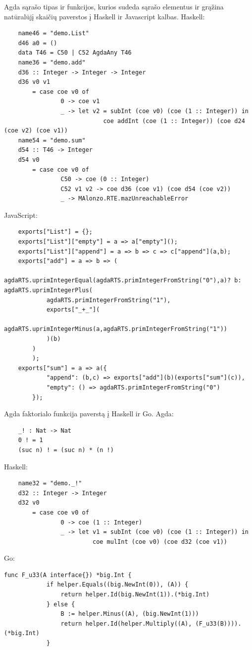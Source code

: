 \documentclass{VUMIFPSkursinis}
\begin{document}
\printbibliography[heading=bibintoc] 

	\label{sec:priedas1}
	Agda sąrašo tipas ir funkcijos, kurios sudeda sąrašo elementus ir grąžina natūralūjį skaičių paverstos į Haskell ir Javascript kalbas. \newline
	Haskell:
	\begin{lstlisting}
	name46 = "demo.List"
	d46 a0 = ()
	data T46 = C50 | C52 AgdaAny T46	
	name36 = "demo.add"
	d36 :: Integer -> Integer -> Integer
	d36 v0 v1
		= case coe v0 of
				0 -> coe v1
				_ -> let v2 = subInt (coe v0) (coe (1 :: Integer)) in
							coe addInt (coe (1 :: Integer)) (coe d24 (coe v2) (coe v1))
	name54 = "demo.sum"
	d54 :: T46 -> Integer
	d54 v0
		= case coe v0 of
				C50 -> coe (0 :: Integer)
				C52 v1 v2 -> coe d36 (coe v1) (coe d54 (coe v2))
				_ -> MAlonzo.RTE.mazUnreachableError
		\end{lstlisting}
	JavaScript:
	\begin{lstlisting}
	exports["List"] = {};
	exports["List"]["empty"] = a => a["empty"]();
	exports["List"]["append"] = a => b => c => c["append"](a,b);
	exports["add"] = a => b => (
		agdaRTS.uprimIntegerEqual(agdaRTS.primIntegerFromString("0"),a)? b: agdaRTS.uprimIntegerPlus(
			agdaRTS.primIntegerFromString("1"),
			exports["_+_"](
				agdaRTS.uprimIntegerMinus(a,agdaRTS.primIntegerFromString("1"))
			)(b)
		)
		);
	exports["sum"] = a => a({
			"append": (b,c) => exports["add"](b)(exports["sum"](c)),
			"empty": () => agdaRTS.primIntegerFromString("0")
		});
		\end{lstlisting}	

\label{sec:priedas2}
Agda faktorialo funkcija paverstą į Haskell ir Go. \newline
Agda:
\begin{lstlisting}
	_! : Nat -> Nat
	0 ! = 1
	(suc n) ! = (suc n) * (n !)
	\end{lstlisting}
Haskell:
\begin{lstlisting}
	name32 = "demo._!"
	d32 :: Integer -> Integer
	d32 v0
		= case coe v0 of
				0 -> coe (1 :: Integer)
				_ -> let v1 = subInt (coe v0) (coe (1 :: Integer)) in
						 coe mulInt (coe v0) (coe d32 (coe v1))
	\end{lstlisting}
Go:
	\begin{lstlisting}[language=GoCust]
		func F_u33(A interface{}) *big.Int {
			if helper.Equals((big.NewInt(0)), (A)) {
				return helper.Id(big.NewInt(1)).(*big.Int)
			} else {
				B := helper.Minus((A), (big.NewInt(1)))
				return helper.Id(helper.Multiply((A), (F_u33(B)))).(*big.Int)
			}
	\end{lstlisting}
\end{document}
